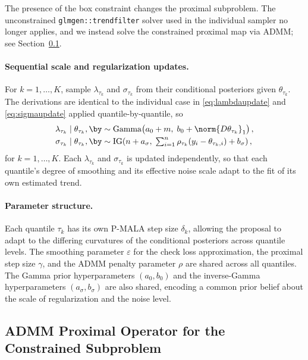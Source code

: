 The presence of the box constraint changes the proximal subproblem. The unconstrained \texttt{glmgen::trendfilter} solver used in the individual sampler no longer applies, and we instead solve the constrained proximal map via ADMM; see Section~\ref{subsec:admm}.

\paragraph{Sequential scale and regularization updates.}
For $k = 1, \ldots, K$, sample $\lambda_{\tau_k}$ and $\sigma_{\tau_k}$ from their conditional posteriors given $\theta_{\tau_k}$. The derivations are identical to the individual case in \eqref{eq:lambdaupdate} and \eqref{eq:sigmaupdate} applied quantile-by-quantile, so
\begin{align*}
    \lambda_{\tau_k} \mid \theta_{\tau_k}, \by &\sim
    \mathrm{Gamma}\!\left(a_0 + m,\;
    b_0 + \norm{D\theta_{\tau_k}}_1\right), \\
    \sigma_{\tau_k} \mid \theta_{\tau_k}, \by &\sim
    \mathrm{IG}\!\left(n + a_\sigma,\;
    \textstyle\sum_{i=1}^n \rho_{\tau_k}(y_i - \theta_{\tau_k, i}) + b_\sigma\right),
\end{align*}
for $k = 1, \ldots, K$. Each $\lambda_{\tau_k}$ and $\sigma_{\tau_k}$ is updated independently, so that each quantile's degree of smoothing and its effective noise scale adapt to the fit of its own estimated trend.

\paragraph{Parameter structure.}
Each quantile $\tau_k$ has its own P-MALA step size $\delta_k$, allowing the proposal to adapt to the differing curvatures of the conditional posteriors across quantile levels. The smoothing parameter $\varepsilon$ for the check loss approximation, the proximal step size $\gamma$, and the ADMM penalty parameter $\rho$ are shared across all quantiles. The Gamma prior hyperparameters $(a_0, b_0)$ and the inverse-Gamma hyperparameters $(a_\sigma, b_\sigma)$ are also shared, encoding a common prior belief about the scale of regularization and the noise level.

\subsection{ADMM Proximal Operator for the Constrained Subproblem}
\label{subsec:admm}

